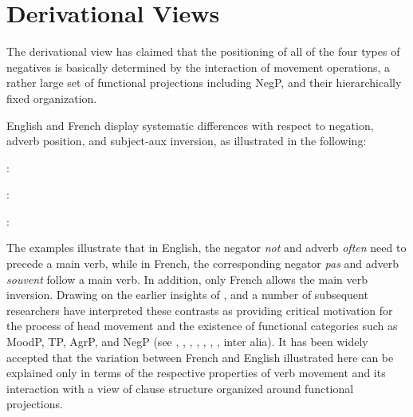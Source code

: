 \documentclass[output=paper]{langsci/langscibook}
\begin{document}
{\section{Derivational Views}

The derivational view has claimed that the positioning of all of the
four types of negatives is basically determined by the interaction of movement
operations, a rather large set of functional projections including NegP,
and their hierarchically fixed organization.


English and French display systematic differences with respect
to negation, adverb position, and subject-aux inversion, as illustrated
in the following:
%


\bigskip

:

\eal\label{exe:1}
\zl

\eal
{}
\zl

:

\eal
{}
\zl

\eal
{}
\zl

:

\eal
{}
\zl


\eal
{}
\zl




The examples illustrate that in English, the negator {\it not}
and adverb {\it often} need to precede a main verb, while in French,
the corresponding negator {\it pas} and adverb {\it souvent} follow
a main verb. In addition, only French allows the main verb inversion.
Drawing on the earlier insights of \citet{Emonds:78},
\citet{Pollock:89,Pollock:94} and a number of subsequent researchers
have interpreted these contrasts as providing critical motivation for
the process of head movement and the existence of functional
categories such as MoodP, TP, AgrP, and NegP (see \citet{Belletti:90}, \citet{Zanuttini:91,Zanuttini:97,Zanuttini:01}, \citet{Chomsky:91,Chomsky:93,Chomsky:95}, \citet{Lasnik:95}, \citet{Haegeman:95,Haegeman:97}, \citet{Vikner:97}, \citet{Zeijlstra:15}, inter alia).
It has been widely
accepted that the variation between French and English illustrated
here can be explained only in terms of the respective properties
of verb movement and its interaction with a view of clause
structure organized around functional projections.

}
\end{document}
